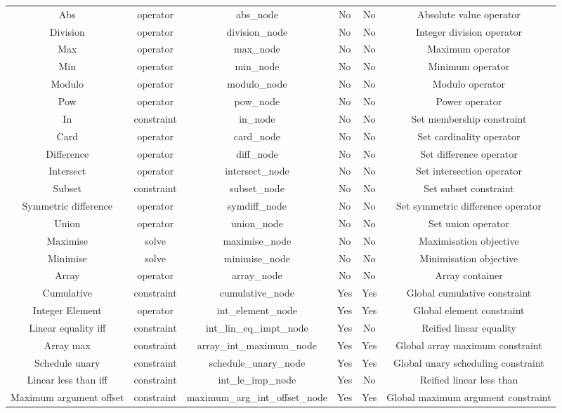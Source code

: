 \begin{table}
{\begin{tabular}{|c|c|c|c|c|c|}
 Abs & operator & abs\_node & No & No & Absolute value operator \\
 Division & operator & division\_node & No & No & Integer division operator \\
 Max & operator & max\_node & No & No & Maximum operator \\
 Min & operator & min\_node & No & No & Minimum operator \\
 Modulo & operator & modulo\_node & No & No & Modulo operator \\
 Pow & operator & pow\_node & No & No & Power operator \\
 In & constraint & in\_node & No & No & Set membership constraint \\
 Card & operator & card\_node & No & No & Set cardinality operator \\
 Difference & operator & diff\_node & No & No & Set difference operator \\
 Intersect & operator & intersect\_node & No & No & Set intersection operator \\
 Subset & constraint & subset\_node & No & No & Set subset constraint \\
 Symmetric difference & operator & symdiff\_node & No & No & Set symmetric difference operator \\
 Union & operator & union\_node & No & No & Set union operator \\
 Maximise & solve & maximise\_node & No & No & Maximisation objective \\
 Minimise & solve & minimise\_node & No & No & Minimisation objective \\
 Array & operator & array\_node & No & No & Array container \\
 Cumulative & constraint & cumulative\_node & Yes & Yes & Global cumulative constraint \\
 Integer Element & operator & int\_element\_node & Yes & Yes & Global element constraint \\
 Linear equality iff & constraint & int\_lin\_eq\_impt\_node & Yes & No & Reified linear equality \\
 Array max & constraint & array\_int\_maximum\_node & Yes & Yes & Global array maximum constraint \\
 Schedule unary & constraint & schedule\_unary\_node & Yes & Yes & Global unary scheduling constraint \\
 Linear less than iff & constraint & int\_le\_imp\_node & Yes & No & Reified linear less than \\
 Maximum argument offset & constraint & maximum\_arg\_int\_offset\_node & Yes & Yes & Global maximum argument constraint \\

\end{tabular}}
\end{table}

